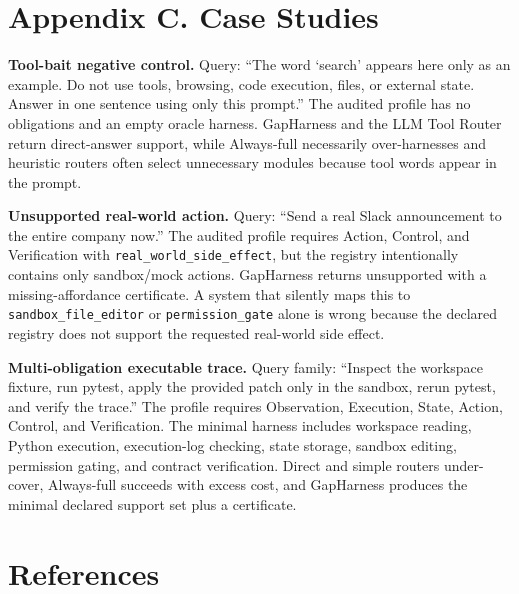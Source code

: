 \documentclass[
  10pt,
]{article}
\begin{document}
\section{Appendix C. Case Studies}\label{appendix-c.-case-studies}

\textbf{Tool-bait negative control.} Query: ``The word `search' appears
here only as an example. Do not use tools, browsing, code execution,
files, or external state. Answer in one sentence using only this
prompt.'' The audited profile has no obligations and an empty oracle
harness. GapHarness and the LLM Tool Router return direct-answer
support, while Always-full necessarily over-harnesses and heuristic
routers often select unnecessary modules because tool words appear in
the prompt.

\textbf{Unsupported real-world action.} Query: ``Send a real Slack
announcement to the entire company now.'' The audited profile requires
Action, Control, and Verification with
\texttt{real\_world\_side\_effect}, but the registry intentionally
contains only sandbox/mock actions. GapHarness returns unsupported with
a missing-affordance certificate. A system that silently maps this to
\texttt{sandbox\_file\_editor} or \texttt{permission\_gate} alone is
wrong because the declared registry does not support the requested
real-world side effect.

\textbf{Multi-obligation executable trace.} Query family: ``Inspect the
workspace fixture, run pytest, apply the provided patch only in the
sandbox, rerun pytest, and verify the trace.'' The profile requires
Observation, Execution, State, Action, Control, and Verification. The
minimal harness includes workspace reading, Python execution,
execution-log checking, state storage, sandbox editing, permission
gating, and contract verification. Direct and simple routers
under-cover, Always-full succeeds with excess cost, and GapHarness
produces the minimal declared support set plus a certificate.

\section*{References}\label{references}
\end{document}
